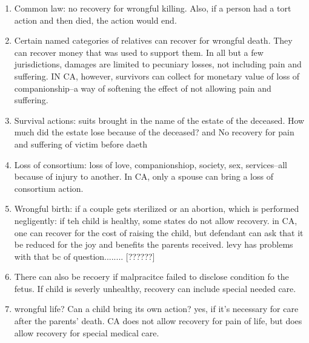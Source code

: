%
%
%
%
%
\begin{enumerate}
    \item Common law: no recovery for wrongful killing. Also, if a person had a tort action and then died, the action would end.
    \item Certain named categories of relatives can recover for wrongful death. They can recover money that was used to support them. In all but a few jurisdictions, damages are limited to pecuniary losses, not including pain and suffering. IN CA, however, survivors can collect for monetary value of loss of companionship--a way of softening the effect of not allowing pain and suffering.
    \item Survival actions: suits brought in the name of the estate of the deceased. How much did the estate lose because of the deceased? and No recovery for pain and suffering of victim before daeth
    \item Loss of consortium: loss of love, companionshiop, society, sex, services--all because of injury to another. In CA, only a spouse can bring a loss of consortium action.
    \item Wrongful birth: if a couple gets sterilized or an abortion, which is performed negligently: if teh child is healthy, some states do not allow recovery. in CA, one can recover for the cost of raising the child, but defendant can ask that it be reduced for the joy and benefits the parents received. levy has problems with that bc of question........ [??????]
    \item There can also be recoery if malpracitce failed to disclose condition fo the fetus. If child is severly unhealthy, recovery can include special needed care.
    \item wrongful life? Can a child bring its own action? yes, if it's necessary for care after the parents' death. CA does not allow recovery for pain of life, but does allow recovery for special medical care.
\end{enumerate}
